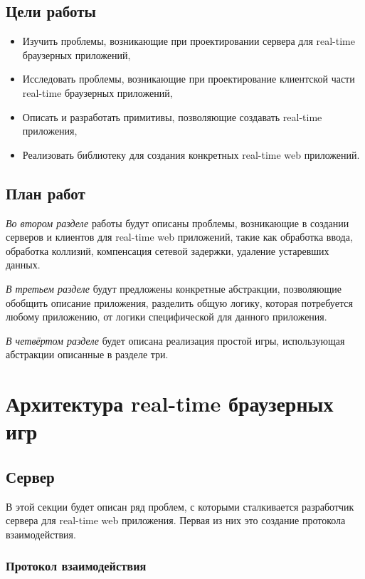 \documentclass[a4paper,14pt, openany]{book}
\begin{document}
\section{Цели работы}

\begin{itemize}
  \item Изучить проблемы, возникающие при проектировании сервера для real-time браузерных приложений,
  \item Исследовать проблемы, возникающие при проектирование клиентской части real-time браузерных приложений,
  \item Описать и разработать примитивы, позволяющие создавать real-time приложения,
  \item Реализовать библиотеку для создания конкретных real-time web приложений.
\end{itemize}

\section{План работ}
\emph{Во втором разделе} работы будут описаны проблемы, возникающие в создании серверов и клиентов для real-time web приложений, такие как обработка ввода, обработка коллизий, компенсация сетевой задержки, удаление устаревших данных. 

\emph{В третьем разделе} будут предложены конкретные абстракции, позволяющие обобщить описание приложения, разделить общую логику, которая потребуется любому приложению, от логики специфической для данного приложения. 

\emph{В четвёртом разделе} будет описана реализация простой игры, использующая абстракции описанные в разделе три.


\chapter{Архитектура  real-time браузерных игр}

\section{Сервер}

В этой секции будет описан ряд проблем, с которыми сталкивается разработчик сервера для real-time web приложения. Первая из них это создание протокола взаимодействия.

\subsection{Протокол взаимодействия}
\end{document}
